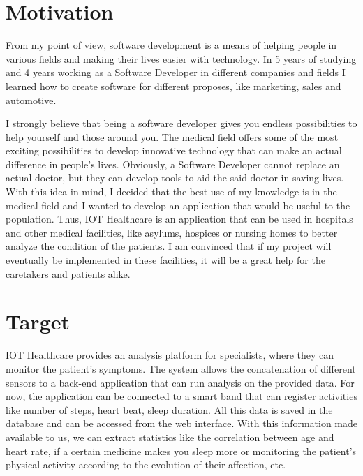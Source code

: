 
\section{Motivation}
From my point of view, software development is a means of helping people in various fields and making their lives easier with technology.
In 5 years of studying  and 4 years working as a Software Developer in different
companies and fields I learned how to create software for different proposes, like marketing,
sales and automotive.

I strongly believe that being a software developer gives you endless possibilities to help yourself and those around you. The medical field offers some of the most exciting possibilities to develop innovative technology that can make an actual difference in people's lives. Obviously, a Software Developer cannot replace an actual doctor, but they can develop tools to aid the said doctor in saving lives. With this idea in mind, I decided that the best use of my knowledge is in the medical field and I wanted to develop an application that would be useful to the population.
Thus, IOT Healthcare is an application that can be used in hospitals and other medical facilities, like asylums, hospices or nursing homes to better analyze the condition of the patients. I am convinced that if my project will eventually be implemented in these facilities, it will be a great help for the caretakers and patients alike.



\section{Target}

IOT Healthcare provides an analysis platform for specialists, where they can monitor the patient's symptoms. The system allows the concatenation of different sensors to a back-end application that can run analysis on the provided data. For now, the application can be connected to a smart band that can register activities like number of steps, heart beat, sleep duration. All this data is saved in the database and can be accessed from the web interface. With this information made available to us, we can extract statistics like the correlation between age and heart rate, if a certain medicine makes you sleep more or monitoring the patient's physical activity according to the evolution of their affection, etc.